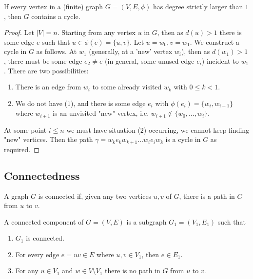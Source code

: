 \documentclass[10pt, a4paper]{article}
\begin{document}
\begin{lemma}\label{disc:lem:deggeqtwothencycle}
    If every vertex in a
    (finite)
    graph $G = (V, E, \phi)$ has degree strictly larger than $1$,
    then $G$ contains a cycle.
    \begin{proof}
        Let $|V| = n$.
        Starting from any vertex $u$ in $G$,
        then as $d(u) > 1$ there is some edge $e$ such that $u \in \phi(e) = \{u, v\}$.
        Let $u = w_0, v = w_1$.
        We construct a cycle in $G$ as follows.
        At $w_1$
        (generally,
        at a 'new' vertex $w_i$),
        then as $d(w_1) > 1$,
        there must be some edge $e_2 \neq e$
        (in general,
        some unused edge $e_i$)
        incident to $w_1$.
        There are two possibilities:
        \begin{enumerate}[label = (\arabic*)]
            \item There is an edge from $w_i$ to some already visited $w_k$ with $0 \leq k< 1$.

            \item We do not have ($1$),
            and there is some edge $e_i$ with $\phi(e_i) = \{w_i, w_{i + 1}\}$ where $w_{i + 1}$ is an unvisited "new" vertex,
            i.e. $w_{i + 1} \notin \{w_0, \dotsc, w_i\}$.
        \end{enumerate}
        At some point $i \leq n$ we must have situation ($2$) occurring,
        we cannot keep finding "new" vertices.
        Then the path $\gamma = w_ke_kw_{k + 1}\dotsc w_ie_iw_k$ is a cycle in $G$ as required.
    \end{proof}
\end{lemma}

\subsection{Connectedness}

\begin{definition}
    A graph $G$ is connected if,
    given any two vertices $u, v$ of $G$,
    there is a path in $G$ from $u$ to $v$.
\end{definition}

\begin{definition}
    A connected component of $G = (V, E)$ is a subgraph $G_1 = (V_1, E_1)$ such that
    \begin{enumerate}[label = (\arabic*)]
        \item $G_1$ is connected.

        \item For every edge $e = uv \in E$ where $u, v \in V_1$,
        then $e \in E_1$.

        \item For any $u \in V_1$ and $w \in V \setminus V_1$ there is no path in $G$ from $u$ to $v$.
    \end{enumerate}
\end{definition}
\end{document}
